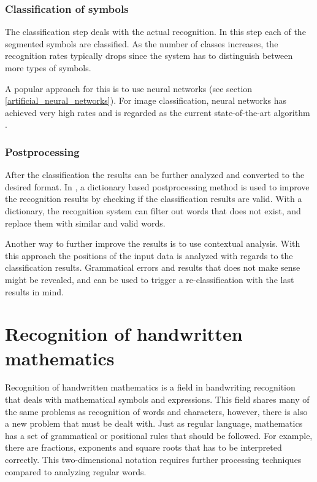 \subsubsection{Classification of symbols}
The classification step deals with the actual recognition. In this step each of the segmented symbols are classified. As the number of classes increases, the recognition rates typically drops since the system has to distinguish between more types of symbols.

A popular approach for this is to use neural networks (see section \ref{artificial_neural_networks}). For image classification, neural networks has achieved very high rates and is regarded as the current state-of-the-art algorithm \cite{seif_deep_2018}.

\subsubsection{Postprocessing}

After the classification the results can be further analyzed and converted to the desired format. In \cite{hu_research_2011}, a dictionary based postprocessing method is used to improve the recognition results by checking if the classification results are valid. With a dictionary, the recognition system can filter out words that does not exist, and replace them with similar and valid words. 

Another way to further improve the results is to use contextual analysis. With this approach the positions of the input data is analyzed with regards to the classification results. Grammatical errors and results that does not make sense might be revealed, and can be used to trigger a re-classification with the last results in mind.


\section{Recognition of handwritten mathematics} 
\label{recognition_of_handwritten_mathematics}
Recognition of handwritten mathematics is a field in handwriting recognition that deals with mathematical symbols and expressions. This field shares many of the same problems as recognition of words and characters, however, there is also a new problem that must be dealt with. Just as regular language, mathematics has a set of grammatical or positional rules that should be followed. For example, there are fractions, exponents and square roots that has to be interpreted correctly. This two-dimensional notation requires further processing techniques compared to analyzing regular words.

